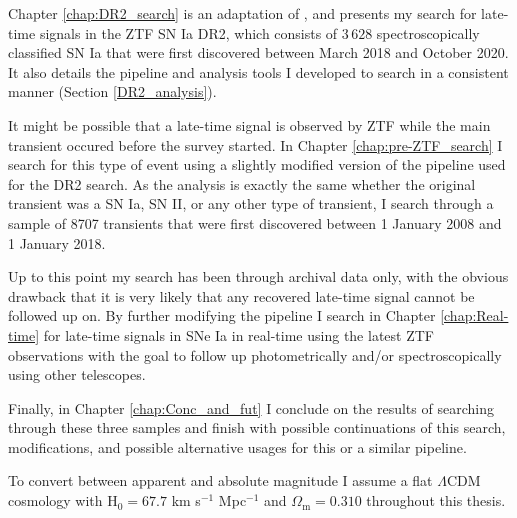 \documentclass[a4paper,oneside,12pt, class=Latex/Classes/PhDthesisPSnPDF, crop=false]{standalone}
\begin{document}
Chapter \ref{chap:DR2_search} is an adaptation of \cite{Terwel_2024_paper1}, and presents my search for late-time signals in the ZTF SN Ia DR2, which consists of $3\,628$ spectroscopically classified SN Ia that were first discovered between March 2018 and October 2020. It also details the pipeline and analysis tools I developed to search in a consistent manner (Section \ref{DR2_analysis}).

It might be possible that a late-time signal is observed by ZTF while the main transient occured before the survey started. In Chapter \ref{chap:pre-ZTF_search} I search for this type of event using a slightly modified version of the pipeline used for the DR2 search. As the analysis is exactly the same whether the original transient was a SN Ia, SN II, or any other type of transient, I search through a sample of 8707 transients that were first discovered between 1 January 2008 and 1 January 2018.

Up to this point my search has been through archival data only, with the obvious drawback that it is very likely that any recovered late-time signal cannot be followed up on. By further modifying the pipeline I search in Chapter \ref{chap:Real-time} for late-time signals in SNe Ia in real-time using the latest ZTF observations with the goal to follow up photometrically and/or spectroscopically using other telescopes.

Finally, in Chapter \ref{chap:Conc_and_fut} I conclude on the results of searching through these three samples and finish with possible continuations of this search, modifications, and possible alternative usages for this or a similar pipeline.

To convert between apparent and absolute magnitude I assume a flat $\Lambda$CDM cosmology with H$_0 = 67.7$ km s$^{-1}$ Mpc$^{-1}$ and $\Omega_\text{m} = 0.310$ \citep{Planck18VI} throughout this thesis. %
\end{document}
